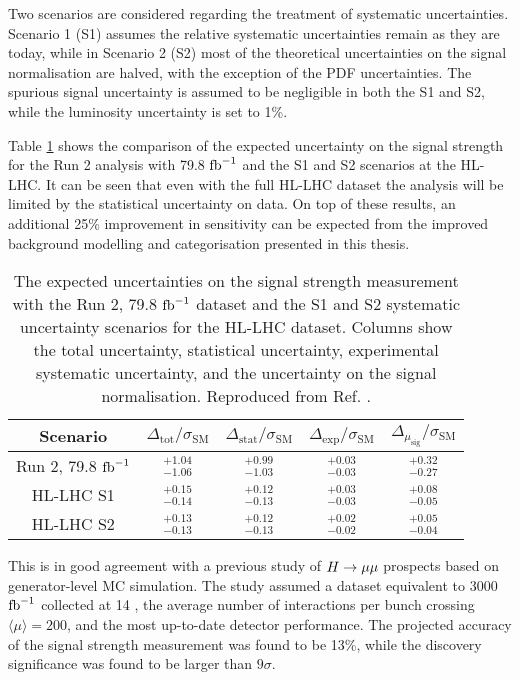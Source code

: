 Two scenarios are considered regarding the treatment of systematic
uncertainties. Scenario 1 (S1) assumes the relative systematic
uncertainties remain as they are today, while in Scenario 2 (S2)
most of the theoretical uncertainties on the signal normalisation
are halved, with the exception of the PDF uncertainties. The
spurious signal uncertainty is assumed to be negligible in both the S1
and S2, while the luminosity uncertainty is set to 1\%.

Table \ref{tab:out:res} shows the comparison of the expected uncertainty
on the signal strength for the Run 2 analysis with 79.8 $\text{fb}^{-1}$
and the S1 and S2 scenarios at the HL-LHC. It can be seen that 
even with the full HL-LHC dataset the analysis will be limited
by the statistical uncertainty on data. On top of these results,
an additional 25\% improvement in sensitivity can be expected
from the improved background modelling and categorisation
presented in this thesis.

\begin{table}[htb]
  \renewcommand{\arraystretch}{1.3}
  \centering
  \caption{
    The expected uncertainties on the signal strength measurement with
    the Run 2, 79.8 $\text{fb}^{-1}$ dataset and the S1 and S2 systematic
    uncertainty scenarios for the HL-LHC dataset. Columns show
    the total uncertainty, statistical uncertainty, experimental
    systematic uncertainty, and the uncertainty on the signal
    normalisation.
    Reproduced from Ref. \cite{ATL-PHYS-PUB-2018-054}.}
  \label{tab:out:res}
  \begin{tabular}{ccccc}
    \toprule
    \midrule
    Scenario & $\Delta_\text{tot}/\sigma_\text{SM}$ 
             & $\Delta_\text{stat}/\sigma_\text{SM}$ 
             & $\Delta_\text{exp}/\sigma_\text{SM}$ 
             & $\Delta_{\mu_\text{sig}}/\sigma_\text{SM}$ \\
    \midrule
    Run 2, 79.8 $\text{fb}^{-1}$ & $^{+1.04}_{-1.06}$ & $^{+0.99}_{-1.03}$ & $^{+0.03}_{-0.03}$ & $^{+0.32}_{-0.27}$ \\
    HL-LHC S1          & $^{+0.15}_{-0.14}$ & $^{+0.12}_{-0.13}$ & $^{+0.03}_{-0.03}$ & $^{+0.08}_{-0.05}$ \\
    HL-LHC S2          & $^{+0.13}_{-0.13}$ & $^{+0.12}_{-0.13}$ & $^{+0.02}_{-0.02}$ & $^{+0.05}_{-0.04}$ \\
    \midrule
    \bottomrule
  \end{tabular}
\end{table}

This is in good agreement with a previous study of $H \rightarrow \mu\mu$ prospects
\cite{ATL-PHYS-PUB-2018-006} based on generator-level MC simulation.
The study assumed a dataset equivalent to 3000 $\text{fb}^{-1}$ collected at 14
\TeV, the average number of interactions per bunch crossing
$\langle \mu \rangle = 200$, and the most up-to-date detector performance.
The projected accuracy of the signal strength measurement was found to
be 13\%, while the discovery significance was found to be larger than
$9\sigma$.

